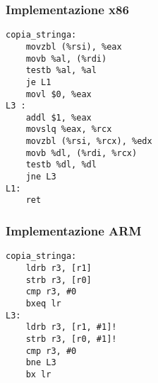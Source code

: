 \documentclass[class=book, crop=false, oneside]{standalone}
\begin{document}
\subsubsection{Implementazione x86}

\begin{verbatim}
copia_stringa:
	movzbl (%rsi), %eax
	movb %al, (%rdi)
	testb %al, %al
	je L1
	movl $0, %eax
L3 :
	addl $1, %eax
	movslq %eax, %rcx
	movzbl (%rsi, %rcx), %edx
	movb %dl, (%rdi, %rcx)
	testb %dl, %dl
	jne L3
L1:
	ret
\end{verbatim}

\subsubsection{Implementazione ARM}

\begin{verbatim}
copia_stringa:
	ldrb r3, [r1]
	strb r3, [r0]
	cmp r3, #0
	bxeq lr
L3:
	ldrb r3, [r1, #1]!
	strb r3, [r0, #1]!
	cmp r3, #0
	bne L3
	bx lr
\end{verbatim}
\end{document}
